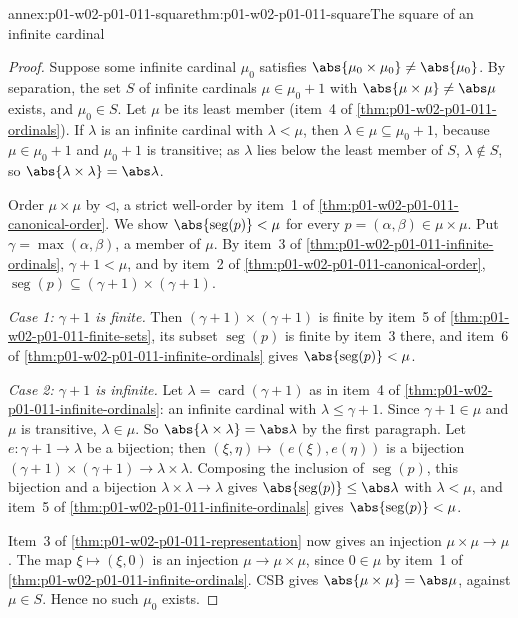 \begin{annexitem}{annex:p01-w02-p01-011-square}{thm:p01-w02-p01-011-square}{The square of an infinite cardinal}
\begin{proof}
Suppose some infinite cardinal \(\mu_0\) satisfies
\(\abs{\mu_0\times\mu_0}\ne\abs{\mu_0}\). By separation, the set \(S\) of
infinite cardinals \(\mu\in\mu_0+1\) with \(\abs{\mu\times\mu}\ne\abs\mu\)
exists, and \(\mu_0\in S\). Let \(\mu\) be its least member (item~4 of
\cref{thm:p01-w02-p01-011-ordinals}). If \(\lambda\) is an infinite cardinal
with \(\lambda<\mu\), then \(\lambda\in\mu\subseteq\mu_0+1\), because
\(\mu\in\mu_0+1\) and \(\mu_0+1\) is transitive; as \(\lambda\) lies below
the least member of \(S\), \(\lambda\notin S\), so
\(\abs{\lambda\times\lambda}=\abs\lambda\).

Order \(\mu\times\mu\) by \(\lhd\), a strict well-order by item~1 of
\cref{thm:p01-w02-p01-011-canonical-order}. We show
\(\abs{\operatorname{seg}(p)}<\mu\) for every \(p=(\alpha,\beta)\in\mu\times\mu\).
Put \(\gamma=\max(\alpha,\beta)\), a member of \(\mu\). By item~3 of
\cref{thm:p01-w02-p01-011-infinite-ordinals}, \(\gamma+1<\mu\), and by
item~2 of \cref{thm:p01-w02-p01-011-canonical-order},
\(\operatorname{seg}(p)\subseteq(\gamma+1)\times(\gamma+1)\).

\emph{Case 1: \(\gamma+1\) is finite.} Then \((\gamma+1)\times(\gamma+1)\) is
finite by item~5 of \cref{thm:p01-w02-p01-011-finite-sets}, its subset
\(\operatorname{seg}(p)\) is finite by item~3 there, and item~6 of
\cref{thm:p01-w02-p01-011-infinite-ordinals} gives
\(\abs{\operatorname{seg}(p)}<\mu\).

\emph{Case 2: \(\gamma+1\) is infinite.} Let \(\lambda=\operatorname{card}(\gamma+1)\) as in
item~4 of \cref{thm:p01-w02-p01-011-infinite-ordinals}: an infinite cardinal
with \(\lambda\leq\gamma+1\). Since \(\gamma+1\in\mu\) and \(\mu\) is
transitive, \(\lambda\in\mu\). So \(\abs{\lambda\times\lambda}=\abs\lambda\)
by the first paragraph. Let \(e:\gamma+1\to\lambda\) be a bijection; then
\((\xi,\eta)\mapsto(e(\xi),e(\eta))\) is a bijection
\((\gamma+1)\times(\gamma+1)\to\lambda\times\lambda\). Composing the
inclusion of \(\operatorname{seg}(p)\), this bijection and a bijection
\(\lambda\times\lambda\to\lambda\) gives
\(\abs{\operatorname{seg}(p)}\leq\abs\lambda\) with \(\lambda<\mu\), and
item~5 of \cref{thm:p01-w02-p01-011-infinite-ordinals} gives
\(\abs{\operatorname{seg}(p)}<\mu\).

Item~3 of \cref{thm:p01-w02-p01-011-representation} now gives an injection
\(\mu\times\mu\to\mu\). The map \(\xi\mapsto(\xi,0)\) is an injection
\(\mu\to\mu\times\mu\), since \(0\in\mu\) by item~1 of
\cref{thm:p01-w02-p01-011-infinite-ordinals}. CSB gives
\(\abs{\mu\times\mu}=\abs\mu\), against \(\mu\in S\). Hence no such
\(\mu_0\) exists.


\end{proof}
\end{annexitem}
